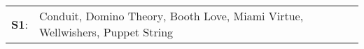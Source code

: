 \begin{supertabular}{p{0.03\textwidth}p{0.92\textwidth}}
 \textbf{S1}:  &  Conduit\textsuperscript{}, \enspace Domino Theory\textsuperscript{}, \enspace Booth Love\textsuperscript{}, \enspace Miami Virtue\textsuperscript{}, \enspace Wellwishers\textsuperscript{}, \enspace Puppet String\textsuperscript{}  \enspace  \\
\end{supertabular}
